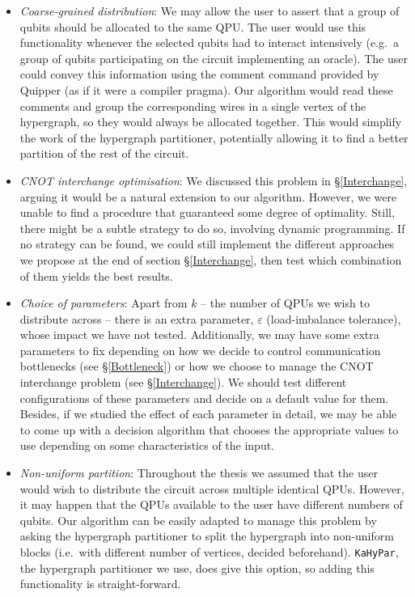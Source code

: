 \begin{itemize}
  \item \textit{Coarse-grained distribution}: We may allow the user to assert that a group of qubits should be allocated to the same QPU. The user would use this functionality whenever the selected qubits had to interact intensively (e.g.\ a group of qubits participating on the circuit implementing an oracle). The user could convey this information using the comment command provided by Quipper (as if it were a compiler pragma). Our algorithm would read these comments and group the corresponding wires in a single vertex of the hypergraph, so they would always be allocated together. This would simplify the work of the hypergraph partitioner, potentially allowing it to find a better partition of the rest of the circuit.
  \item \textit{CNOT interchange optimisation}: We discussed this problem in \S\ref{Interchange}, arguing it would be a natural extension to our algorithm. However, we were unable to find a procedure that guaranteed some degree of optimality. Still, there might be a subtle strategy to do so, involving dynamic programming. If no strategy can be found, we could still implement the different approaches we propose at the end of section \S\ref{Interchange}, then test which combination of them yields the best results.
  \item \textit{Choice of parameters}: Apart from \(k\) -- the number of QPUs we wish to distribute across -- there is an extra parameter, \(\varepsilon\) (load-imbalance tolerance), whose impact we have not tested. Additionally, we may have some extra parameters to fix depending on how we decide to control communication bottlenecks (see \S\ref{Bottleneck}) or how we choose to manage the CNOT interchange problem (see \S\ref{Interchange}). We should test different configurations of these parameters and decide on a default value for them. Besides, if we studied the effect of each parameter in detail, we may be able to come up with a decision algorithm that chooses the appropriate values to use depending on some characteristics of the input.
  \item \textit{Non-uniform partition}: Throughout the thesis we assumed that the user would wish to distribute the circuit across multiple identical QPUs. However, it may happen that the QPUs available to the user have different numbers of qubits. Our algorithm can be easily adapted to manage this problem by asking the hypergraph partitioner to split the hypergraph into non-uniform blocks (i.e.\ with different number of vertices, decided beforehand). \texttt{KaHyPar}, the hypergraph partitioner we use, does give this option, so adding this functionality is straight-forward.

\end{itemize}
